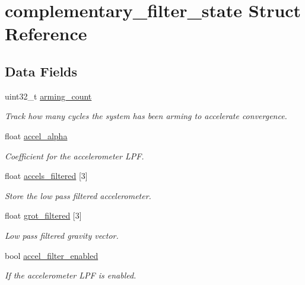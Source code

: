 \hypertarget{structcomplementary__filter__state}{\section{complementary\-\_\-filter\-\_\-state \-Struct \-Reference}
\label{structcomplementary__filter__state}
}
\subsection*{\-Data \-Fields}
\begin{DoxyCompactItemize}
\item 
uint32\-\_\-t \hyperlink{structcomplementary__filter__state_a25592bc35eb34062d082854dd0dbce44}{arming\-\_\-count}
\begin{DoxyCompactList}\small\item\em \-Track how many cycles the system has been arming to accelerate convergence. \end{DoxyCompactList}\item 
float \hyperlink{structcomplementary__filter__state_a2a0dfc57428cafd19006fe7cd1dee0ce}{accel\-\_\-alpha}
\begin{DoxyCompactList}\small\item\em \-Coefficient for the accelerometer \-L\-P\-F. \end{DoxyCompactList}\item 
float \hyperlink{structcomplementary__filter__state_a88a370dd8e3f412f189e5a585b9d1a52}{accels\-\_\-filtered} \mbox{[}3\mbox{]}
\begin{DoxyCompactList}\small\item\em \-Store the low pass filtered accelerometer. \end{DoxyCompactList}\item 
float \hyperlink{structcomplementary__filter__state_a91176df07de5e650a8afe8bec74d3ce1}{grot\-\_\-filtered} \mbox{[}3\mbox{]}
\begin{DoxyCompactList}\small\item\em \-Low pass filtered gravity vector. \end{DoxyCompactList}\item 
bool \hyperlink{structcomplementary__filter__state_a7d259f4954fc2a3ed14353faa41f6414}{accel\-\_\-filter\-\_\-enabled}
\begin{DoxyCompactList}\small\item\em \-If the accelerometer \-L\-P\-F is enabled. \end{DoxyCompactList}\item 

\end{DoxyCompactItemize}
